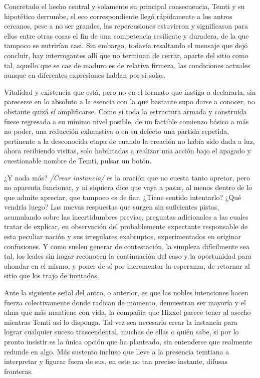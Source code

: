 \documentclass[
]{book}
\begin{document}
Concretado el hecho central y solamente su principal consecuencia, Temti y su hipotético derrumbe, el eco correspondiente llegó rápidamente a los antros cercanos, pese a no ser grandes, las repercusiones estuvieron y significaron para ellos entre otras cosas el fin de una competencia resiliente y duradera, de la que tampoco se nutrirían casi. Sin embargo, todavía resaltando el mensaje que dejó concluir, hay interrogantes allí que no terminan de cerrar, aparte del sitio como tal, aquello que se cae de maduro es de relativa firmeza, las condiciones actuales aunque en diferentes expresiones hablan por sí solas.

Vitalidad y existencia que está, pero no en el formato que instiga a declararla, sin parecerse en lo absoluto a la esencia con la que bastante supo darse a conocer, no obstante quizá sí amplificarse. Como si toda la estructura armada y construida fuese regresada a su mínimo nivel posible, de un factible comienzo básico a más no poder, una reducción exhaustiva o en su defecto una partida repetida, pertinente a la desconocida etapa de cuando la creación no había sido dada a luz, ahora recibiendo visitas, solo habilitadas a realizar una acción bajo el apagado y cuestionable nombre de Temti, pulsar un botón.

¿Y nada más? \emph{/Crear instancia/} es la oración que no cuesta tanto apretar, pero no aparenta funcionar, y ni siquiera dice que vaya a pasar, al menos dentro de lo que admite apreciar, que tampoco es de fiar. ¿Tiene sentido intentarlo? ¿Qué vendría luego? Las nuevas respuestas que surgen sin suficientes pistas, acumulando sobre las incertidumbres previas, preguntas adicionales a las cuales tratar de explicar, en observación del probablemente expectante responsable de esta peculiar nación y sus irregulares exabruptos, experimentados en originar confusiones. Y como suelen generar de contestación, la simpleza difícilmente sea tal, los leales sin hogar reconocen la continuación del caso y la oportunidad para ahondar en el mismo, y poner de sí por incrementar la esperanza, de retornar al sitio que los trajo de invitados.

Ante la siguiente señal del antro, o anterior, es que las nobles intenciones hacen fuerza colectivamente donde radican de momento, demuestran ser mayoría y el alma que más mantiene con vida, la compañía que Hixxel parece tener al asecho mientras Temti así lo disponga. Tal vez sea necesario crear la instancia para lograr cualquier suceso trascendental, muchas de ellas o quién sabe, si por lo pronto insistir es la única opción que ha planteado, sin entenderse que realmente redunde en algo. Más sustento incluso que lleve a la presencia temtiana a interpretar y figurar fuera de sus, en este no tan preciso instante, difusas fronteras.
\end{document}
